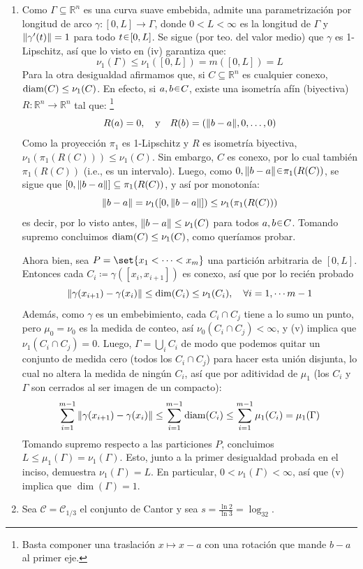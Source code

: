 \begin{sol}
\begin{enumerate}[label = (\roman*), leftmargin=1.5em]
\item %
Como $\Gamma\subseteq\mathbb{R}^n$ es una curva suave embebida, admite una parametrización por longitud de arco $\gamma \colon [0,L] \to \Gamma$, donde $0<L<\infty$ es la longitud de $\Gamma$ y $\norm{\gamma'(t)} = 1$ para todo $t\en[0,L]$. Se sigue (por teo. del valor medio) que $\gamma$ es 1-Lipschitz, así que lo visto en (iv) garantiza que:
\[
\nu_1(\Gamma) \le \nu_1([0,L]) = m([0,L]) = L
\]
Para la otra desigualdad afirmamos que, si $C\subseteq\mathbb{R}^n$ es cualquier conexo, $\operatorname{diam}(C) \le \nu_1(C)$. En efecto, si $a,b \en C$, existe una isometría afín (biyectiva) $R \colon \mathbb{R}^n \to \mathbb{R}^n$ tal que:%
\footnote{
    Basta componer una traslación $x\mapsto x-a$ con una rotación que mande $b-a$ al primer eje.
}
\[
R(a) = 0,
\quad\text{y}\quad
R(b) = (\norm{b-a},0,\dots,0)
\]
Como la proyección $\pi_1$ es 1-Lipschitz y $R$ es isometría biyectiva, $\nu_1(\pi_1(R(C))) \leq \nu_1(C)$. Sin embargo, $C$ es conexo, por lo cual también $\pi_1(R(C))$ (i.e., es un intervalo). Luego, como $0,\norm{b-a}\en\pi_1(R(C))$, se sigue que $[0,\norm{b-a}] \subseteq \pi_1(R(C))$, y así por monotonía:
\[
\norm{b-a} = \nu_1([0,\norm{b-a}]) \leq \nu_1(\pi_1(R(C)))
\]
es decir, por lo visto antes, $\norm{b-a} \leq \nu_1(C)$ para todos $a,b\en C$. Tomando supremo concluimos $\operatorname{diam}(C) \leq \nu_1(C)$, como queríamos probar.\par
Ahora bien, sea $P=\set{x_1<\cdots<x_m}$ una partición arbitraria de $[0,L]$. Entonces cada $C_i \coloneq \gamma([x_i,x_{i+1}])$ es conexo, así que por lo recién probado
\[
\norm{\gamma(x_{i+1}) - \gamma(x_i)} \le\dim(C_i) \le \nu_1(C_i),
\quad\forall i=1,\cdots m-1
\]
Además, como $\gamma$ es un embebimiento, cada $C_i \cap C_j$ tiene a lo sumo un punto, pero $\mu_0 = \nu_0$ es la medida de conteo, así $\nu_0(C_i \cap C_j) < \infty$, y (v) implica que $\nu_1(C_i \cap C_j) = 0$. Luego, $\Gamma = \bigcup_i C_i$ de modo que podemos quitar un conjunto de medida cero (todos los $C_i \cap C_j$) para hacer esta unión disjunta, lo cual no altera la medida de ningún $C_i$, así que por aditividad de $\mu_1$ (los $C_i$ y $\Gamma$ son cerrados al ser imagen de un compacto):
\[
\sum^{m-1}_{i=1} \norm{\gamma(x_{i+1}) - \gamma(x_i)}
\leq
\sum^{m-1}_{i=1} \operatorname{diam}(C_i)
\leq
\sum^{m-1}_{i=1} \mu_1(C_i)
=
\mu_1(\Gamma)    
\]
Tomando supremo respecto a las particiones $P$, concluimos $L \leq \mu_1(\Gamma) = \nu_1(\Gamma)$. Esto, junto a la primer desigualdad probada en el inciso, demuestra $\nu_1(\Gamma) = L$. En particular, $0< \nu_1(\Gamma) < \infty$, así que (v) implica que $\dim(\Gamma) = 1$.
\item %
Sea $\mathcal{C}=\mathcal{C}_{1/3}$ el conjunto de Cantor y sea $s = \frac{\ln 2}{\ln 3} = \log_32$.


\end{enumerate}
\end{sol}
